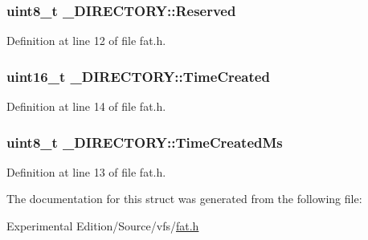 \subsubsection[{\texorpdfstring{Reserved}{Reserved}}]{\setlength{\rightskip}{0pt plus 5cm}uint8\+\_\+t \+\_\+\+D\+I\+R\+E\+C\+T\+O\+R\+Y\+::\+Reserved}\hypertarget{struct__DIRECTORY_a0c6a3f809355165500632158bb89273c}{}\label{struct__DIRECTORY_a0c6a3f809355165500632158bb89273c}


Definition at line 12 of file fat.\+h.

\subsubsection[{\texorpdfstring{Time\+Created}{TimeCreated}}]{\setlength{\rightskip}{0pt plus 5cm}uint16\+\_\+t \+\_\+\+D\+I\+R\+E\+C\+T\+O\+R\+Y\+::\+Time\+Created}\hypertarget{struct__DIRECTORY_a6eda82476c383777293ee3ec945537d7}{}\label{struct__DIRECTORY_a6eda82476c383777293ee3ec945537d7}


Definition at line 14 of file fat.\+h.

\subsubsection[{\texorpdfstring{Time\+Created\+Ms}{TimeCreatedMs}}]{\setlength{\rightskip}{0pt plus 5cm}uint8\+\_\+t \+\_\+\+D\+I\+R\+E\+C\+T\+O\+R\+Y\+::\+Time\+Created\+Ms}\hypertarget{struct__DIRECTORY_a5fea072b6e2e5b9c1921d6d04f9ab5e9}{}\label{struct__DIRECTORY_a5fea072b6e2e5b9c1921d6d04f9ab5e9}


Definition at line 13 of file fat.\+h.



The documentation for this struct was generated from the following file\+:\begin{DoxyCompactItemize}
\item 
Experimental Edition/\+Source/vfs/\hyperlink{fat_8h}{fat.\+h}\end{DoxyCompactItemize}
